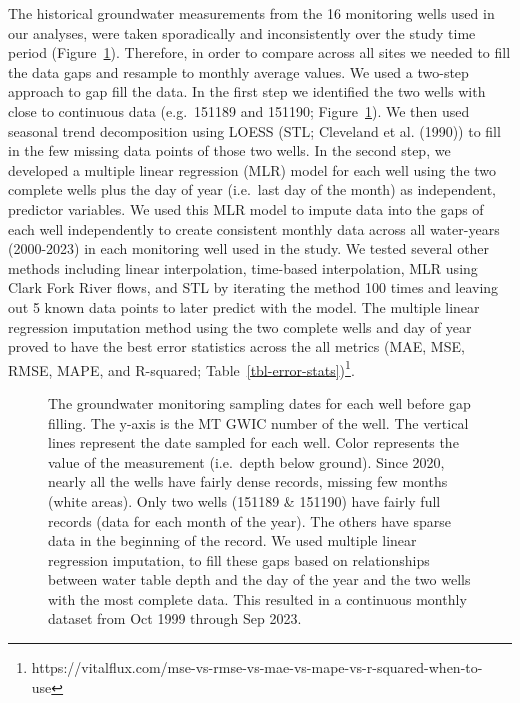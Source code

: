 \documentclass[
  letterpaper,
  DIV=11,
  numbers=noendperiod]{scrartcl}
\begin{document}
The historical groundwater measurements from the 16 monitoring wells
used in our analyses, were taken sporadically and inconsistently over
the study time period (Figure~\ref{fig-gw-imputation}). Therefore, in
order to compare across all sites we needed to fill the data gaps and
resample to monthly average values. We used a two-step approach to gap
fill the data. In the first step we identified the two wells with close
to continuous data (e.g.~151189 and 151190;
Figure~\ref{fig-gw-imputation}). We then used seasonal trend
decomposition using LOESS (STL; Cleveland et al. (1990)) to fill in the
few missing data points of those two wells. In the second step, we
developed a multiple linear regression (MLR) model for each well using
the two complete wells plus the day of year (i.e.~last day of the month)
as independent, predictor variables. We used this MLR model to impute
data into the gaps of each well independently to create consistent
monthly data across all water-years (2000-2023) in each monitoring well
used in the study. We tested several other methods including linear
interpolation, time-based interpolation, MLR using Clark Fork River
flows, and STL by iterating the method 100 times and leaving out 5 known
data points to later predict with the model. The multiple linear
regression imputation method using the two complete wells and day of
year proved to have the best error statistics across the all metrics
(MAE, MSE, RMSE, MAPE, and R-squared;
Table~\ref{tbl-error-stats})\footnote{https://vitalflux.com/mse-vs-rmse-vs-mae-vs-mape-vs-r-squared-when-to-use}.

\begin{figure}


\caption{\label{fig-gw-imputation}The groundwater monitoring sampling
dates for each well before gap filling. The y-axis is the MT GWIC number
of the well. The vertical lines represent the date sampled for each
well. Color represents the value of the measurement (i.e.~depth below
ground). Since 2020, nearly all the wells have fairly dense records,
missing few months (white areas). Only two wells (151189 \& 151190) have
fairly full records (data for each month of the year). The others have
sparse data in the beginning of the record. We used multiple linear
regression imputation, to fill these gaps based on relationships between
water table depth and the day of the year and the two wells with the
most complete data. This resulted in a continuous monthly dataset from
Oct 1999 through Sep 2023.}

\end{figure}%
\end{document}
